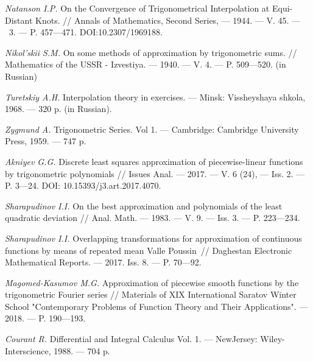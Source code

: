 \begin{thebibliography}{111}
\textit{Natanson I.P.} On the Convergence of Trigonometrical Interpolation at Equi-Distant Knots. // Annals of Mathematics, Second Series, --- 1944. --- V. 45. --- \No\ 3. --- P. 457---471. DOI:10.2307/1969188.

\textit{Nikol'skii S.M.} On some methods of approximation by trigonometric sums. // Mathematics of the USSR - Izvestiya. --- 1940. --- V. 4. --- P. 509---520. (in Russian)

\textit{Turetskiy A.H.} Interpolation theory in exercises. --- Minsk: Vissheyshaya shkola, 1968. --- 320 p. (in Russian).

\textit{Zygmund A.} Trigonometric Series. Vol 1. --- Cambridge:
Cambridge University Press, 1959. --- 747 p.	

\textit{Akniyev G.G.} Discrete least squares approximation of piecewise-linear functions by trigonometric polynomials // Issues Anal. --- 2017. --- V. 6 (24), --- Iss. 2. --- P. 3---24. DOI: 10.15393/j3.art.2017.4070.

\textit{Sharapudinov I.I.} On the best approximation and polynomials of the least quadratic deviation // Anal. Math. --- 1983. --- V. 9. --- Iss. 3. --- P. 223---234.

\textit{Sharapudinov I.I.} Overlapping transformations for approximation of continuous functions by means of repeated mean Valle Poussin~// Daghestan Electronic Mathematical Reports. --- 2017. Iss. 8. --- P. 70---92.

\textit{Magomed-Kasumov M.G.}
Approximation of piecewise smooth functions by the trigonometric Fourier series //
Materials of XIX International Saratov Winter School "Contemporary Problems of Function Theory and Their Applications". --- 2018. --- P. 190---193.

\textit{Courant R.} Differential and Integral Calculus Vol. 1. --- NewJersey:
Wiley-Interscience, 1988. --- 704 p.



\end{thebibliography}

